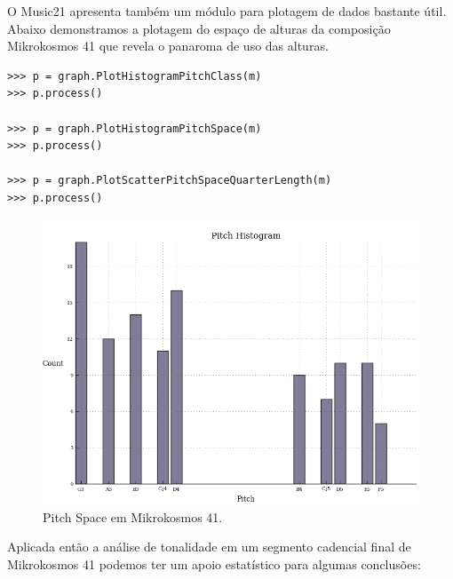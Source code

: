 \documentclass[
	12pt,				%
	openright,			%
	twoside,			%
	a4paper,			%
	english,			%
	french,				%
	spanish,			%
	brazil				%
	]{abntex2}
\begin{document}
O Music21 apresenta também um módulo para plotagem de dados bastante útil. Abaixo demonstramos a plotagem do espaço de alturas da composição Mikrokosmos 41 que revela o panaroma de uso das alturas.


\begin{lstlisting}
>>> p = graph.PlotHistogramPitchClass(m)
>>> p.process()

>>> p = graph.PlotHistogramPitchSpace(m)
>>> p.process()

>>> p = graph.PlotScatterPitchSpaceQuarterLength(m)
>>> p.process()

\end{lstlisting}


\begin{figure}[!h]
	\caption{\label{fig_grafico} Pitch Space em Mikrokosmos 41.} 
	\begin{center}
	    \includegraphics[scale=0.4]{estudosM21/mikro041Pspace.png}
	\end{center}
\end{figure}


Aplicada então a análise de tonalidade em um segmento cadencial final de Mikrokosmos 41 podemos ter um apoio estatístico para algumas conclusões:
\end{document}
